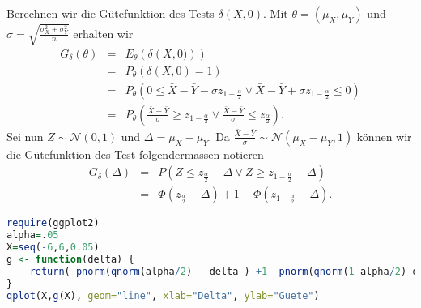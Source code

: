 Berechnen wir die Gütefunktion des Tests $\delta\left( X,0 \right)$. Mit $\theta=\left( \mu_X,\mu_Y \right)$
und $\sigma= \sqrt{\frac{\sigma_X^2 + \sigma_Y^2}{n}}$ erhalten wir
\begin{eqnarray}
    G_\delta(\theta) &=&  E_\theta \left( \delta \left( X,0) \right)  \right) \\
    &=& P_\theta \left( \delta(X,0) = 1 \right) \\
    &=& P_\theta \left( 0 \leq \bar X - \bar Y - \sigma z_{1-\frac{\alpha}{2}} \vee
        \bar X - \bar Y + \sigma z_{1-\frac{\alpha}{2}} \leq 0\right) \\
    &=& P_\theta \left( \frac{\bar X - \bar Y}{\sigma} \geq z_{1-\frac{\alpha}{2}} \vee
    \frac{\bar X - \bar Y}{\sigma} \leq z_{\frac{\alpha}{2}}\right).
\end{eqnarray}
Sei nun $Z\sim\mathcal N(0,1)$ und $\Delta=\mu_X - \mu_Y$. 
Da $\frac{\bar X -\bar Y}{\sigma}\sim \mathcal N(\mu_X-\mu_Y,1)$ können wir die Gütefunktion des 
Test folgendermassen notieren
\begin{eqnarray}
    G_\delta (\Delta) &=& P \left( Z \leq z_{\frac{\alpha}{2}} -\Delta \vee
    Z \geq z_{1-\frac{\alpha}{2}} -\Delta \right)  \\
    &=& \Phi\left( z_{\frac{\alpha}{2}} - \Delta\right) 
    + 1 - \Phi\left( z_{1-\frac{\alpha}{2}} -\Delta \right). 
\end{eqnarray}




\begin{lstlisting}[language=R,caption={R Code zum Plotten der Gütefunktion}]
require(ggplot2)
alpha=.05
X=seq(-6,6,0.05)
g <- function(delta) {
    return( pnorm(qnorm(alpha/2) - delta ) +1 -pnorm(qnorm(1-alpha/2)-delta))  
}
qplot(X,g(X), geom="line", xlab="Delta", ylab="Guete")
\end{lstlisting}







